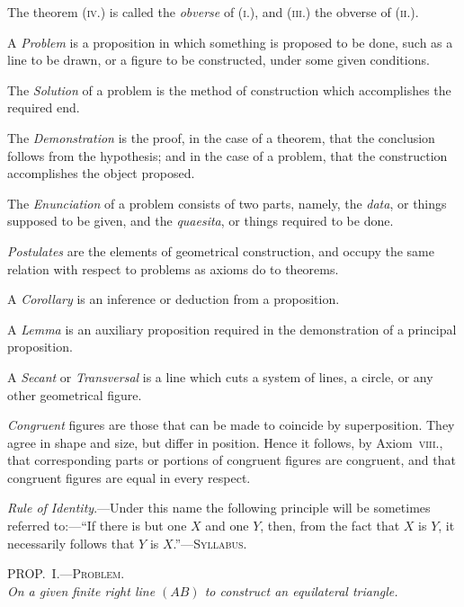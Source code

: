 \documentclass[oneside]{book}
\newcommand\myprop[2]{
\bigskip\Needspace*{4\baselineskip}\begin{center}\textsc{#1}\\\medskip\emph{#2}\par\end{center}
}
\begin{document}
The theorem (\textsc{iv}.) is called the \emph{obverse} of (\textsc{i}.), and
(\textsc{iii}.) the obverse of (\textsc{ii}.).

A \emph{Problem} is a proposition in which something is
proposed to be done, such as a line to be drawn, or a
figure to be constructed, under some given conditions.

The \emph{Solution} of a problem is the method of construction
which accomplishes the required end.

The \emph{Demonstration} is the proof, in the case of a
theorem, that the conclusion follows from the hypothesis;
and in the case of a problem, that the construction
accomplishes the object proposed.

The \emph{Enunciation} of a problem consists of two parts,
namely, the \emph{data}, or things supposed to be given, and
the \emph{quaesita}, or things required to be done.

\emph{Postulates} are the elements of geometrical construction,
and occupy the same relation with respect to
problems as axioms do to theorems.

A \emph{Corollary} is an inference or deduction from a proposition.

A \emph{Lemma} is an auxiliary proposition required in the
demonstration of a principal proposition.

A \emph{Secant} or \emph{Transversal} is a line which cuts a system
of lines, a circle, or any other geometrical figure.

\emph{Congruent} figures are those that can be made to
coincide by superposition. They agree in shape and
size, but differ in position. Hence it follows, by
Axiom~\textsc{viii}., that corresponding parts or portions of
congruent figures are congruent, and that congruent
figures are equal in every respect.

\emph{Rule of Identity}.---Under this name the following
principle will be sometimes referred to:---``If there is
but one $X$ and one $Y$, then, from the fact that $X$ is $Y$,
it necessarily follows that $Y$ is $X$.''---\textsc{Syllabus}.



\myprop{PROP\@.~I.---Problem.}{On a given finite right line $(AB)$ to construct an equilateral triangle.}
\end{document}
